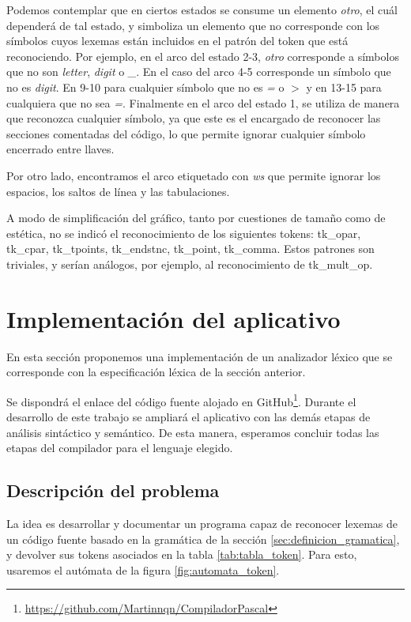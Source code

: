 Podemos contemplar que en ciertos estados se consume un elemento \emph{otro}, el cuál dependerá de tal estado, y simboliza un elemento que no corresponde con los símbolos cuyos lexemas están incluidos en el patrón del token que está reconociendo. Por ejemplo, en el arco del estado 2-3, \emph{otro} corresponde a símbolos que no son \emph{letter}, \emph{digit} o \emph{\_}. En el caso del arco 4-5 corresponde un símbolo que no es \emph{digit}. En 9-10 para cualquier símbolo que no es \emph{=} o \emph{$>$} y en 13-15 para cualquiera que no sea \emph{=}. Finalmente en el arco del estado 1, se utiliza de manera que reconozca cualquier símbolo, ya que este es el encargado de reconocer las secciones comentadas del código, lo que permite ignorar cualquier símbolo encerrado entre llaves.

Por otro lado, encontramos el arco etiquetado con \emph{ws} que permite ignorar los espacios, los saltos de línea y las tabulaciones.

A modo de simplificación del gráfico, tanto por cuestiones de tamaño como de estética, no se indicó el reconocimiento de los siguientes tokens: tk\_opar, tk\_cpar, tk\_tpoints, tk\_endstnc, tk\_point, tk\_comma. Estos patrones son triviales, y serían análogos, por ejemplo, al reconocimiento de tk\_mult\_op.

\section{Implementación del aplicativo}
\label{sec:implementacion_lexico}
En esta sección proponemos una implementación de un analizador léxico que se corresponde con la especificación léxica de la sección anterior.

Se dispondrá el enlace del código fuente alojado en GitHub\footnote{\url{https://github.com/Martinnqn/CompiladorPascal}}. Durante el desarrollo de este trabajo se ampliará el aplicativo con las demás etapas de análisis sintáctico y semántico. De esta manera, esperamos concluir todas las etapas del compilador para el lenguaje elegido.  

\subsection{Descripción del problema}
La idea es desarrollar y documentar un programa capaz de reconocer lexemas de un código fuente basado en la gramática de la sección \ref{sec:definicion_gramatica}, y devolver sus tokens asociados en la tabla \ref{tab:tabla_token}. Para esto, usaremos el autómata de la figura \ref{fig:automata_token}.

